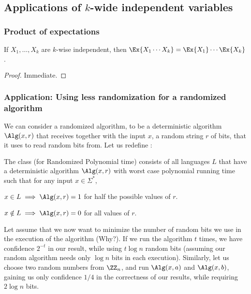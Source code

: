 \subsection{Applications of $k$-wide independent variables}
\subsubsection{Product of expectations}

\begin{lemma}
    If $X_1, \ldots, X_k$ are $k$-wise independent, then
    $\Ex{X_1 \cdots X_k } =\Ex{X_1} \cdots \Ex{X_k}$.
\end{lemma}
\begin{proof}
    Immediate.
\end{proof}

\subsubsection{Application: Using less randomization %
   for a randomized %
   algorithm}

We can consider a randomized algorithm, to be a deterministic
algorithm $\Alg(x,r)$ that receives together with the input $x$, a
random string $r$ of bits, that it uses to read random bits from.  Let
us redefine :
\begin{defn}
    The class  (for Randomized Polynomial time) consists
    of all languages $L$ that have a deterministic algorithm $\Alg
    (x,r)$ with worst case polynomial running time such that for any
    input $x \in \Sigma^*$, \smallskip
    \begin{compactitem}
        \item $x \in L \implies \Alg(x,r) = 1$ for half the possible
        values of $r$.
        
        \item $x \notin L \implies \Alg(x,r) = 0$ for all values of
        $r$.
    \end{compactitem}
\end{defn}

Let assume that we now want to minimize the number of random bits we
use in the execution of the algorithm (Why?). If we run the algorithm
$t$ times, we have confidence $2^{-t}$ in our result, while using $t
\log{n}$ random bits (assuming our random algorithm needs only
$\log{n}$ bits in each execution). Similarly, let us choose two random
numbers from $\ZZ_n$, and run $\Alg(x,a)$ and $\Alg(x, b)$, gaining us
only confidence $1/4$ in the correctness of our results, while
requiring $2\log{n}$ bits.

